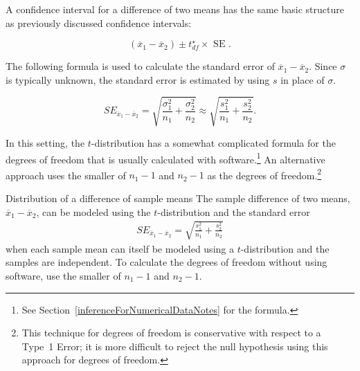 
A confidence interval for a difference of two means has the same basic structure as previously discussed confidence intervals:

\[(\overline{x}_{1} - \overline{x}_{2}) \pm t^\star_{df} \times \text{ SE }. \]


The following formula is used to calculate the standard error of $\overline{x}_{1} - \overline{x}_{2}$. Since $\sigma$ is typically unknown, the standard error is estimated by using $s$ in place of $\sigma$. 

\[
SE_{\overline{x}_{1} - \overline{x}_{2}} = \sqrt{\frac{\sigma_{1}^2}{n_{1}} + \frac{\sigma_{2}^2}{n_{2}}} \approx \sqrt{\frac{s_{1}^2}{n_{1}} + \frac{s_{2}^2}{n_{2}}}.
\]

In this setting, the $t$-distribution has a somewhat complicated formula for the degrees of freedom that is usually calculated with software.\footnote{See Section~\ref{inferenceForNumericalDataNotes} for the formula.} An alternative approach uses the smaller of $n_1 - 1$ and $n_2 - 1$ as the degrees of freedom.\footnote{This technique for degrees of freedom is conservative with respect to a Type~1 Error; it is more difficult to reject the null hypothesis using this approach for degrees of freedom.}


\begin{onebox}{Distribution of a difference of sample means}
The sample difference of two means, $\overline{x}_1 - \overline{x}_2$, can be modeled using the $t$-distribution and the standard error
\begin{eqnarray}
\textstyle
SE_{\overline{x}_{1} - \overline{x}_{2}} = \sqrt{\frac{s_1^2}{n_1} + \frac{s_2^2}{n_2}}
\label{seOfDifferenceInMeans}
\end{eqnarray}
when each sample mean can itself be modeled using a $t$-distribution and the samples are independent. To calculate the degrees of freedom without using software, use the smaller of $n_1 - 1$ and $n_2 - 1$.
\end{onebox}

